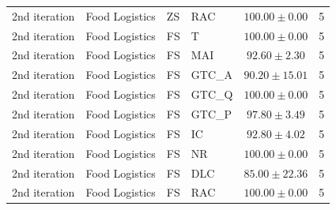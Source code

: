 \begin{longtable}{llllcr}
2nd iteration & Food Logistics & ZS & RAC & $100.00 \pm 0.00$ & 5 \\
2nd iteration & Food Logistics & FS & T & $100.00 \pm 0.00$ & 5 \\
2nd iteration & Food Logistics & FS & MAI & $92.60 \pm 2.30$ & 5 \\
2nd iteration & Food Logistics & FS & GTC_A & $90.20 \pm 15.01$ & 5 \\
2nd iteration & Food Logistics & FS & GTC_Q & $100.00 \pm 0.00$ & 5 \\
2nd iteration & Food Logistics & FS & GTC_P & $97.80 \pm 3.49$ & 5 \\
2nd iteration & Food Logistics & FS & IC & $92.80 \pm 4.02$ & 5 \\
2nd iteration & Food Logistics & FS & NR & $100.00 \pm 0.00$ & 5 \\
2nd iteration & Food Logistics & FS & DLC & $85.00 \pm 22.36$ & 5 \\
2nd iteration & Food Logistics & FS & RAC & $100.00 \pm 0.00$ & 5 \\
\end{longtable}
